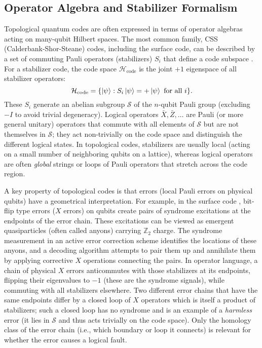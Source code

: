 \documentclass[11pt]{article}
\begin{document}
\subsection{Operator Algebra and Stabilizer Formalism}
Topological quantum codes are often expressed in terms of operator algebras acting on many-qubit Hilbert spaces. The most common family, CSS (Calderbank-Shor-Steane) codes, including the surface code, can be described by a set of commuting Pauli operators (stabilizers) $S_i$ that define a code subspace \cite{Gottesman1997}. For a stabilizer code, the code space $\mathcal{H}_{\text{code}}$ is the joint $+1$ eigenspace of all stabilizer operators:
\[ 
\mathcal{H}_{\text{code}} = \{ \ket{\psi} : S_i \ket{\psi} = +\ket{\psi} \text{ for all } i \}. 
\]
These $S_i$ generate an abelian subgroup $\mathcal{S}$ of the $n$-qubit Pauli group (excluding $-I$ to avoid trivial degeneracy). Logical operators $\bar{X}, \bar{Z}, \dots$ are Pauli (or more general unitary) operators that commute with all elements of $\mathcal{S}$ but are not themselves in $\mathcal{S}$; they act non-trivially on the code space and distinguish the different logical states. In topological codes, stabilizers are usually local (acting on a small number of neighboring qubits on a lattice), whereas logical operators are often \emph{global} strings or loops of Pauli operators that stretch across the code region.

A key property of topological codes is that errors (local Pauli errors on physical qubits) have a geometrical interpretation. For example, in the surface code \cite{Kitaev2003, Dennis2002}, bit-flip type errors ($X$ errors) on qubits create pairs of syndrome excitations at the endpoints of the error chain. These excitations can be viewed as emergent quasiparticles (often called anyons) carrying $\mathbb{Z}_2$ charge. The syndrome measurement in an active error correction scheme identifies the locations of these anyons, and a decoding algorithm attempts to pair them up and annihilate them by applying corrective $X$ operations connecting the pairs. In operator language, a chain of physical $X$ errors anticommutes with those stabilizers at its endpoints, flipping their eigenvalues to $-1$ (these are the syndrome signals), while commuting with all stabilizers elsewhere. Two different error chains that have the same endpoints differ by a closed loop of $X$ operators which is itself a product of stabilizers; such a closed loop has no syndrome and is an example of a \emph{harmless} error (it lies in $\mathcal{S}$ and thus acts trivially on the code space). Only the homology class of the error chain (i.e., which boundary or loop it connects) is relevant for whether the error causes a logical fault.
\end{document}
